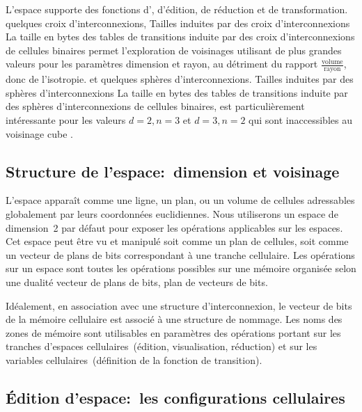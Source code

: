 \noindent L'espace supporte des fonctions d',
d'\'edition, de r\'eduction et de transformation.
%
{quelques croix d'interconnexions,}%
{Tailles induites par des croix d'interconnexions}%
{La taille en bytes des tables de transitions induite par des croix
  d'interconnexions de cellules binaires permet l'exploration de
  voisinages utilisant de plus grandes valeurs pour les param\`etres
  dimension et rayon, au d\'etriment du rapport
  $\frac{\text{volume}}{\text{rayon}}$, donc de l'isotropie.}
%
{et quelques sph\`eres d'interconnexions.}%
{Tailles induites par des sph\`eres d'interconnexions}%
{La taille en bytes des tables de transitions induite par des sph\`eres
  d'interconnexions de cellules binaires, est particuli\`erement
  int\'eressante pour les valeurs $d=2, n=3$ et $d=3, n=2$ qui sont
  inaccessibles au voisinage cube .}

\subsection{Structure de l'espace:~dimension et voisinage}

L'espace appara\^it comme une ligne, un plan, ou un volume de cellules
adres\-sables globalement par leurs coordonn\'ees euclidiennes. %
Nous utiliserons un espace de dimension~2 par d\'efaut pour exposer les
op\'erations applicables sur les espaces. %
Cet espace peut \^etre vu et manipul\'e soit comme un plan de cellules,
soit comme un vecteur de plans de bits correspondant \`a une tranche
cellulaire. %
Les op\'erations sur un espace sont toutes les op\'erations possibles sur
une m\'emoire organis\'ee selon une dualit\'e vecteur de plans de bits, plan
de vecteurs de bits.

Id\'ealement, en association avec une structure d'interconnexion, le
vecteur de bits de la m\'emoire cellulaire est associ\'e \`a une structure
de nommage. %
Les noms des zones de m\'emoire sont utilisables en param\`etres des
op\'erations portant sur les tranches d'espaces cellulaires~(\'edition,
visualisation, r\'eduction) et sur les variables cellulaires~(d\'efinition
de la fonction de transition).

\subsection{\'Edition d'espace:~les configurations cellulaires}

